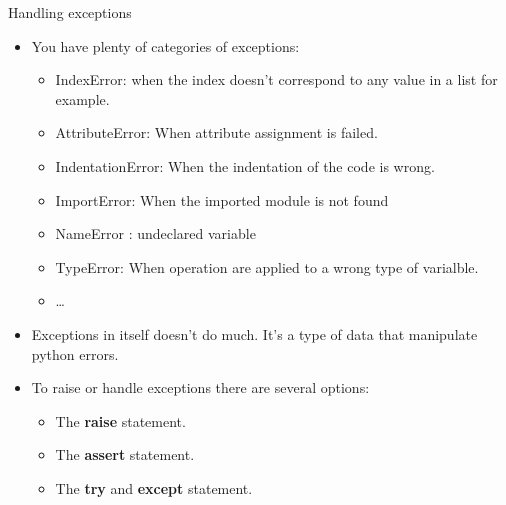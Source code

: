 \documentclass[
  8pt,
  ignorenonframetext,
]{beamer}
\providecommand{\tightlist}{%
  \setlength{\itemsep}{0pt}\setlength{\parskip}{0pt}}
\begin{document}
\begin{frame}{Handling exceptions}
\protect\hypertarget{handling-exceptions}{}
\begin{itemize}
\item
  You have plenty of categories of exceptions:

  \begin{itemize}
  \tightlist
  \item
    IndexError: when the index doesn't correspond to any value in a list
    for example.
  \item
    AttributeError: When attribute assignment is failed.
  \item
    IndentationError: When the indentation of the code is wrong.
  \item
    ImportError: When the imported module is not found
  \item
    NameError : undeclared variable
  \item
    TypeError: When operation are applied to a wrong type of varialble.
  \item
    \ldots{}
  \end{itemize}
\item
  Exceptions in itself doesn't do much. It's a type of data that
  manipulate python errors.
\item
  To raise or handle exceptions there are several options:

  \begin{itemize}
  \tightlist
  \item
    The \textbf{raise} statement.
  \item
    The \textbf{assert} statement.
  \item
    The \textbf{try} and \textbf{except} statement.
  \end{itemize}
\end{itemize}
\end{frame}
\end{document}
